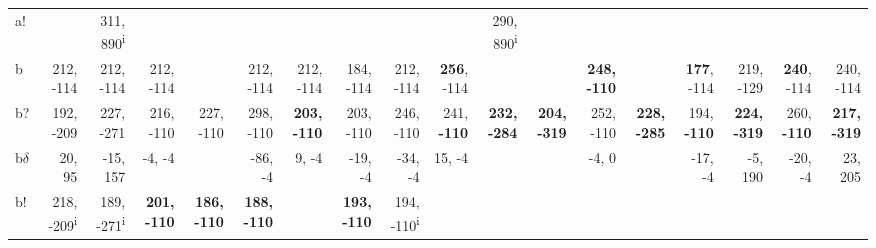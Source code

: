 \begin{table}[p]
{\begin{tabular}{lrrrrrrrrrrrrrrrrr}
a! &  & 311, 890\textsuperscript{i} &  &  &  &  &  &  &  & 290, 890\textsuperscript{i} &  &  &  &  &  &  &  \\
b & 212, -114 & 212, -114 & 212, -114 &  & 212, -114 & 212, -114 & 184, -114 & 212, -114 & \textbf{256}, -114 &  &  & \textbf{248, -110} &  & \textbf{177}, -114 & 219, -129 & \textbf{240}, -114 & 240, -114 \\
b? & 192, -209 & 227, -271 & 216, -110 & 227, -110 & 298, -110 & \textbf{203, -110} & 203, -110 & 246, -110 & 241, \textbf{-110} & \textbf{232, -284} & \textbf{204, -319} & 252, -110 & \textbf{228, -285} & 194, \textbf{-110} & \textbf{224, -319} & 260, \textbf{-110} & \textbf{217, -319} \\
b$\delta$ & 20, 95 & -15, 157 & -4, -4 &  & -86, -4 & 9, -4 & -19, -4 & -34, -4 & 15, -4 &  &  & -4, 0 &  & -17, -4 & -5, 190 & -20, -4 & 23, 205 \\
b! & 218, -209\textsuperscript{i} & 189, -271\textsuperscript{i} & \textbf{201, -110} & \textbf{186, -110} & \textbf{188, -110} &  & \textbf{193, -110} & 194, -110\textsuperscript{i} &  &  &  &  &  &  &  &  &  \\

\end{tabular}
}
\end{table}
\clearpage


